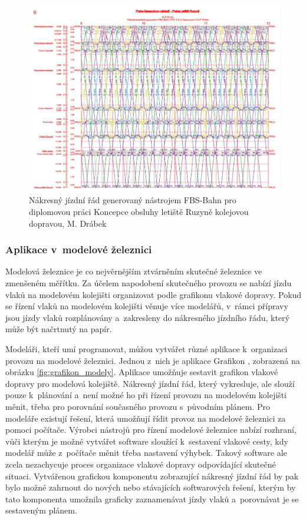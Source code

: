 \begin{figure}[ht]
	\centering
	\includegraphics[width=\textwidth]{../img/kap1_studie_njr}
	\caption{Nákresný jízdní řád generovaný nástrojem FBS-Bahn pro diplomovou práci Koncepce obsluhy letiště Ruzyně kolejovou dopravou, M. Drábek~\cite{dipl_drabek}}
	\label{fig:studie_njr}
\end{figure}

\subsubsection{Aplikace v~modelové železnici}
Modelová železnice je co nejvěrnějším ztvárněním skutečné železnice ve zmenšeném měřítku. Za účelem napodobení skutečného provozu se nabízí jízdu vlaků na modelovém kolejišti organizovat podle grafikonu vlakové dopravy. Pokud se řízení vlaků na modelovém kolejišti věnuje více modelářů, v~rámci přípravy jsou jízdy vlaků rozplánovány a~zakresleny do nákresného jízdního řádu, který může být načrtnutý na papír.

Modeláři, kteří umí programovat, můžou vytvářet různé aplikace k~organizaci provozu na modelové železnici. Jednou z~nich je aplikace Grafikon \cite{Grafikon}, zobrazená na obrázku \ref{fig:grafikon_modely}. Aplikace umožňuje sestavit grafikon vlakové dopravy pro modelová kolejiště. Nákresný jízdní řád, který vykresluje, ale slouží pouze k~plánování a~není možné ho při řízení provozu na modelovém kolejišti měnit, třeba pro porovnání současného provozu s~původním plánem. Pro modeláře existují řešení, která umožňují řídit provoz na modelové železnici za pomoci počítače. Výrobci nástrojů pro řízení modelové železnice nabízí rozhraní, vůči kterým je možné vytvářet software sloužící k~sestavení vlakové cesty, kdy modelář může z~počítače měnit třeba nastavení výhybek. Takový software ale zcela nezachycuje proces organizace vlakové dopravy odpovídající skutečné situaci. Vytvářenou grafickou komponentu zobrazující nákresný jízdní řád by pak bylo možné zahrnout do nových nebo stávajících softwarových řešení, kterým by tato komponenta umožnila graficky zaznamenávat jízdy vlaků a~porovnávat je se sestaveným plánem.

